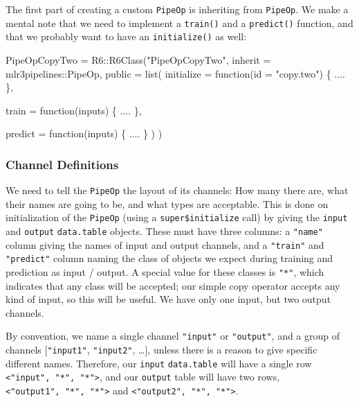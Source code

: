 \documentclass[12pt,]{scrbook}
\newenvironment{Shaded}{}{}
\newcommand{\ControlFlowTok}[1]{\textcolor[rgb]{0.00,0.00,1.00}{#1}}
\newcommand{\DataTypeTok}[1]{#1}
\newcommand{\KeywordTok}[1]{\textcolor[rgb]{0.00,0.00,1.00}{#1}}
\newcommand{\NormalTok}[1]{#1}
\newcommand{\OperatorTok}[1]{#1}
\newcommand{\StringTok}[1]{\textcolor[rgb]{0.00,0.50,0.50}{#1}}
\begin{document}
The first part of creating a custom \texttt{PipeOp} is inheriting from \texttt{PipeOp}.
We make a mental note that we need to implement a \texttt{train()} and a \texttt{predict()} function, and that we probably want to have an \texttt{initialize()} as well:

\begin{Shaded}
\begin{Highlighting}[]
\NormalTok{PipeOpCopyTwo =}\StringTok{ }\NormalTok{R6}\OperatorTok{::}\KeywordTok{R6Class}\NormalTok{(}\StringTok{"PipeOpCopyTwo"}\NormalTok{,}
  \DataTypeTok{inherit =}\NormalTok{ mlr3pipelines}\OperatorTok{::}\NormalTok{PipeOp,}
  \DataTypeTok{public =} \KeywordTok{list}\NormalTok{(}
    \DataTypeTok{initialize =} \ControlFlowTok{function}\NormalTok{(}\DataTypeTok{id =} \StringTok{"copy.two"}\NormalTok{) \{}
\NormalTok{      ....}
\NormalTok{    \},}

    \DataTypeTok{train =} \ControlFlowTok{function}\NormalTok{(inputs) \{}
\NormalTok{      ....}
\NormalTok{    \},}

    \DataTypeTok{predict =} \ControlFlowTok{function}\NormalTok{(inputs) \{}
\NormalTok{      ....}
\NormalTok{    \}}
\NormalTok{  )}
\NormalTok{)}
\end{Highlighting}
\end{Shaded}

\hypertarget{channel-definitions}{%
\subsubsection{Channel Definitions}\label{channel-definitions}}

We need to tell the \texttt{PipeOp} the layout of its channels: How many there are, what their names are going to be, and what types are acceptable.
This is done on initialization of the \texttt{PipeOp} (using a \texttt{super\$initialize} call) by giving the \texttt{input} and \texttt{output} \texttt{data.table} objects.
These must have three columns: a \texttt{"name"} column giving the names of input and output channels, and a \texttt{"train"} and \texttt{"predict"} column naming the class of objects we expect during training and prediction as input / output.
A special value for these classes is \texttt{"*"}, which indicates that any class will be accepted; our simple copy operator accepts any kind of input, so this will be useful. We have only one input, but two output channels.

By convention, we name a single channel \texttt{"input"} or \texttt{"output"}, and a group of channels {[}\texttt{"input1"}, \texttt{"input2"}, \ldots{}{]}, unless there is a reason to give specific different names. Therefore, our \texttt{input} \texttt{data.table} will have a single row \texttt{\textless{}"input",\ "*",\ "*"\textgreater{}}, and our \texttt{output} table will have two rows, \texttt{\textless{}"output1",\ "*",\ "*"\textgreater{}} and \texttt{\textless{}"output2",\ "*",\ "*"\textgreater{}}.
\end{document}
